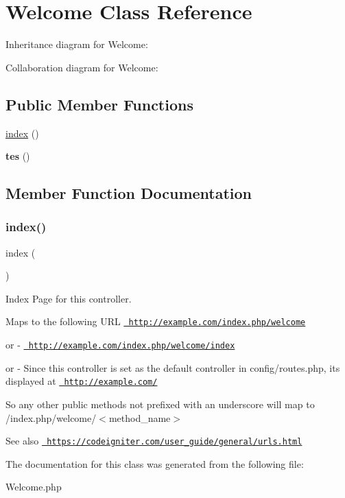 \hypertarget{class_welcome}{}\section{Welcome Class Reference}
\label{class_welcome}


Inheritance diagram for Welcome\+:


Collaboration diagram for Welcome\+:
\subsection*{Public Member Functions}
\begin{DoxyCompactItemize}
\item 
\mbox{\hyperlink{class_welcome_a149eb92716c1084a935e04a8d95f7347}{index}} ()
\item 
\mbox{\label{class_welcome_a7f3c2d562afcfc1c3e52bda7637191cf}} 
{\bfseries tes} ()
\end{DoxyCompactItemize}


\subsection{Member Function Documentation}
\mbox{\label{class_welcome_a149eb92716c1084a935e04a8d95f7347}} 
\subsubsection{\texorpdfstring{index()}{index()}}
{\footnotesize\ttfamily index (\begin{DoxyParamCaption}{ }\end{DoxyParamCaption})}

Index Page for this controller.

Maps to the following U\+RL \href{http://example.com/index.php/welcome}{\texttt{ http\+://example.\+com/index.\+php/welcome}}
\begin{DoxyItemize}
\item or -\/ \href{http://example.com/index.php/welcome/index}{\texttt{ http\+://example.\+com/index.\+php/welcome/index}}
\item or -\/ Since this controller is set as the default controller in config/routes.\+php, it\textquotesingle{}s displayed at \href{http://example.com/}{\texttt{ http\+://example.\+com/}}
\end{DoxyItemize}

So any other public methods not prefixed with an underscore will map to /index.php/welcome/$<$method\+\_\+name$>$ \begin{DoxySeeAlso}{See also}
\href{https://codeigniter.com/user_guide/general/urls.html}{\texttt{ https\+://codeigniter.\+com/user\+\_\+guide/general/urls.\+html}} 
\end{DoxySeeAlso}


The documentation for this class was generated from the following file\+:\begin{DoxyCompactItemize}
\item 
Welcome.\+php\end{DoxyCompactItemize}
